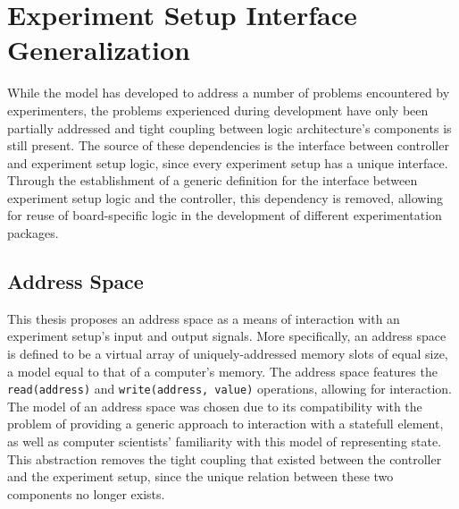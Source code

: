 \documentclass[main.tex]{subfiles}
\begin{document}
\section{Experiment Setup Interface Generalization}
\label{sectioncontrollerabstraction}





While the model has developed to address a number of problems encountered by experimenters, the problems experienced during development have only been partially addressed and tight coupling between logic architecture's components is still present. The source of these dependencies is the interface between controller and experiment setup logic, since every experiment setup has a unique interface. Through the establishment of a generic definition for the interface between experiment setup logic and the controller, this dependency is removed, allowing for reuse of board-specific logic in the development of different experimentation packages. 

\subsection{Address Space}
This thesis proposes an address space as a means of interaction with an experiment setup's input and output signals. More specifically, an address space is defined to be a virtual array of uniquely-addressed memory slots of equal size, a model equal to that of a computer's memory. The address space features the \texttt{read(address)} and \texttt{write(address, value)} operations, allowing for interaction. The model of an address space was chosen due to its compatibility with the problem of providing a generic approach to interaction with a statefull element, as well as computer scientists' familiarity with this model of representing state. This abstraction removes the tight coupling that existed between the controller and the experiment setup, since the unique relation between these two components no longer exists.
\end{document}
